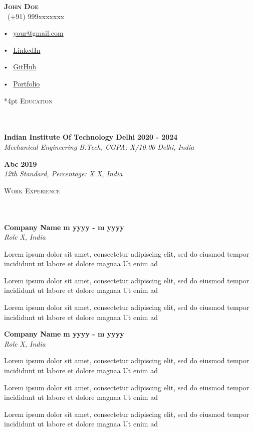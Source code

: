 \documentclass[letterpaper,10pt]{article}
\newcommand{\contact}[3]{
\vspace*{3pt}
\begin{center}
{\LARGE \scshape {#1}}\\
\vspace{5pt}
#2 
\vspace{2pt}
#3
\end{center}
\vspace*{-8pt}
}
\newcommand{\header}[1]{{
\hspace*{0pt}\vspace*{6pt} \textsc{#1}} \vspace*{-6pt} 
\lineunder
}
\newcommand{\lineunder}{
\vspace*{-8pt} \\ \hspace*{-3pt} 
\hrulefill \\
}
\newcommand{\college}[4]{
\textbf{#1} \hfill \textbf{#2} \\ 
\textit{#3} \hfill \textit{#4} \\
\vspace*{5pt}
}
\newcommand{\employer}[5]{%
  \vspace*{2pt}%
  \textbf{#1} #2 \hfill \textbf{#3}\\
  \textit{#4} \hfill \textit{#5} \\
  \vspace*{2pt}%
}
\renewcommand{\labelitemi}{
$\vcenter{\hbox{\tiny$\bullet$}}$\hspace*{3pt}
}
\renewcommand{\labelitemii}{
$\vcenter{\hbox{\tiny$\bullet$}}$\hspace*{-3pt}
}
\newenvironment{bullet-list-minor}{
\begin{list}{\labelitemii}{\setlength\leftmargin{15pt} 
\topsep 0pt \itemsep -2pt}}{\vspace*{4pt}\end{list}
}
\begin{document}
\small
\smallskip
\vspace*{-44pt}

\contact{\textbf{John Doe}}
{\faPhone\ (+91) 999xxxxxxx
\labelitemi \faEnvelope\ \href{mailto:your@gmail.com}{your@gmail.com}
\labelitemi \faLinkedin\ \href{https://4vinn.netlify.app}{LinkedIn}
\labelitemi \faGithub\ \href{https://4vinn.netlify.app}{GitHub}%
\labelitemi \faLink\ \href{https://4vinn.netlify.app}{Portfolio}}

\vspace*{4pt}%
\header{Education}

    \college{Indian Institute Of Technology Delhi}{2020 - 2024}
    {Mechanical Engineering B.Tech, CGPA: X/10.00}{Delhi, India}
   
    \college{Abc}{2019}
    {12th Standard, Percentage: X}{X, India}
 
\vspace*{0pt}%
\header{Work Experience}

    \employer{Company Name}
    {}{m yyyy - m yyyy}{Role}{X, India}
	\begin{bullet-list-minor}
	\item Lorem ipsum dolor sit amet, consectetur adipiscing elit, sed do eiusmod tempor incididunt ut labore et dolore magnaa Ut enim ad
	\item Lorem ipsum dolor sit amet, consectetur adipiscing elit, sed do eiusmod tempor incididunt ut labore et dolore magnaa Ut enim ad 
        \item Lorem ipsum dolor sit amet, consectetur adipiscing elit, sed do eiusmod tempor incididunt ut labore et dolore magnaa Ut enim ad
        \end{bullet-list-minor}

     \employer{Company Name}
    {}{m yyyy - m yyyy}{Role}{X, India}
	\begin{bullet-list-minor}
	\item Lorem ipsum dolor sit amet, consectetur adipiscing elit, sed do eiusmod tempor incididunt ut labore et dolore magnaa Ut enim ad
	\item Lorem ipsum dolor sit amet, consectetur adipiscing elit, sed do eiusmod tempor incididunt ut labore et dolore magnaa Ut enim ad 
        \item Lorem ipsum dolor sit amet, consectetur adipiscing elit, sed do eiusmod tempor incididunt ut labore et dolore magnaa Ut enim ad
        \end{bullet-list-minor}
\end{document}
